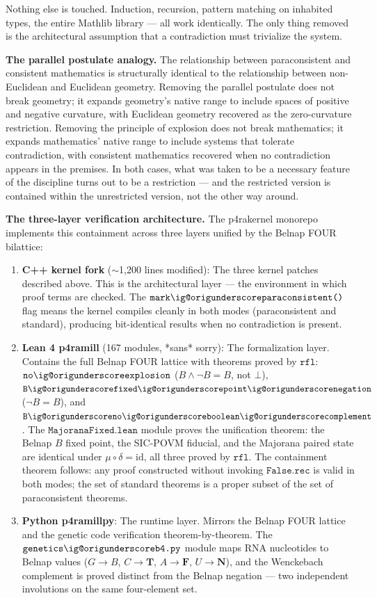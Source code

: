 \documentclass[12pt,a4paper]{article}
\makeatletter
\renewcommand{\_}{\ig@origunderscore\discretionary{}{}{}}
\makeatother
\begin{document}
Nothing else is touched. Induction, recursion, pattern matching on inhabited types, the entire Mathlib library --- all
work identically. The only thing removed is the architectural assumption that a contradiction must trivialize the
system.

\textbf{The parallel postulate analogy.} The relationship between paraconsistent and consistent mathematics is
structurally identical to the relationship between non-Euclidean and Euclidean geometry. Removing the parallel
postulate does not break geometry; it expands geometry's native range to include spaces of positive and negative
curvature, with Euclidean geometry recovered as the zero-curvature restriction. Removing the principle of explosion
does not break mathematics; it expands mathematics' native range to include systems that tolerate contradiction, with
consistent mathematics recovered when no contradiction appears in the premises. In both cases, what was taken to be a
necessary feature of the discipline turns out to be a restriction --- and the restricted version is contained within
the unrestricted version, not the other way around.

\textbf{The three-layer verification architecture.} The p4rakernel monorepo implements this containment across three
layers unified by the Belnap FOUR bilattice:

\begin{enumerate}
 \item \textbf{C++ kernel fork} ($\sim$1,200 lines modified): The three kernel patches described above. This is the
architectural layer --- the environment in which proof terms are checked. The $\texttt{mark\_paraconsistent()}$ flag
means the kernel compiles cleanly in both modes (paraconsistent and standard), producing bit-identical results when no
contradiction is present.
 \item \textbf{Lean 4 p4ramill} (167 modules, *sans* sorry): The formalization layer. Contains the full Belnap FOUR
lattice with theorems proved by $\texttt{rfl}$: $\texttt{no\_explosion}$ ($B \wedge \neg B = B$, not $\bot$),
$\texttt{B\_fixed\_point\_negation}$ ($\neg B = B$), and $\texttt{B\_no\_boolean\_complement}$. The
$\texttt{MajoranaFixed.lean}$ module proves the unification theorem: the Belnap $B$ fixed point, the SIC-POVM
fiducial, and the Majorana paired state are identical under $\mu \circ \delta = \text{id}$, all three proved by
$\texttt{rfl}$. The containment theorem follows: any proof constructed without invoking $\texttt{False.rec}$ is valid
in both modes; the set of standard theorems is a proper subset of the set of paraconsistent theorems.
 \item \textbf{Python p4ramill\_py}: The runtime layer. Mirrors the Belnap FOUR lattice and the genetic code
verification theorem-by-theorem. The $\texttt{genetics\_b4.py}$ module maps RNA nucleotides to Belnap values
($G \to B$, $C \to \mathbf{T}$, $A \to \mathbf{F}$, $U \to \mathbf{N}$), and the Wenckebach complement is proved
distinct from the Belnap negation --- two independent involutions on the same four-element set.
\end{enumerate}
\end{document}
